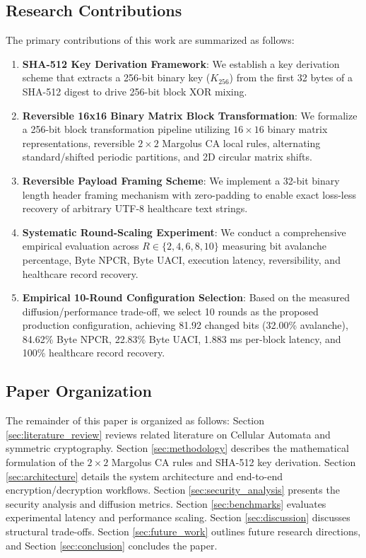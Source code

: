 \subsection{Research Contributions}
\label{subsec:contributions}
The primary contributions of this work are summarized as follows:
\begin{enumerate}
    \item \textbf{SHA-512 Key Derivation Framework}: We establish a key derivation scheme that extracts a 256-bit binary key ($K_{256}$) from the first 32 bytes of a SHA-512 digest to drive 256-bit block XOR mixing.
    \item \textbf{Reversible 16x16 Binary Matrix Block Transformation}: We formalize a 256-bit block transformation pipeline utilizing $16 \times 16$ binary matrix representations, reversible $2 \times 2$ Margolus CA local rules, alternating standard/shifted periodic partitions, and 2D circular matrix shifts.
    \item \textbf{Reversible Payload Framing Scheme}: We implement a 32-bit binary length header framing mechanism with zero-padding to enable exact loss-less recovery of arbitrary UTF-8 healthcare text strings.
    \item \textbf{Systematic Round-Scaling Experiment}: We conduct a comprehensive empirical evaluation across $R \in \{2, 4, 6, 8, 10\}$ measuring bit avalanche percentage, Byte NPCR, Byte UACI, execution latency, reversibility, and healthcare record recovery.
    \item \textbf{Empirical 10-Round Configuration Selection}: Based on the measured diffusion/performance trade-off, we select 10 rounds as the proposed production configuration, achieving 81.92 changed bits (32.00\% avalanche), 84.62\% Byte NPCR, 22.83\% Byte UACI, 1.883 ms per-block latency, and 100\% healthcare record recovery.
\end{enumerate}

\subsection{Paper Organization}
\label{subsec:organization}
The remainder of this paper is organized as follows: Section \ref{sec:literature_review} reviews related literature on Cellular Automata and symmetric cryptography. Section \ref{sec:methodology} describes the mathematical formulation of the $2 \times 2$ Margolus CA rules and SHA-512 key derivation. Section \ref{sec:architecture} details the system architecture and end-to-end encryption/decryption workflows. Section \ref{sec:security_analysis} presents the security analysis and diffusion metrics. Section \ref{sec:benchmarks} evaluates experimental latency and performance scaling. Section \ref{sec:discussion} discusses structural trade-offs. Section \ref{sec:future_work} outlines future research directions, and Section \ref{sec:conclusion} concludes the paper.
